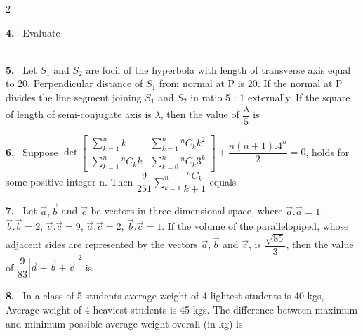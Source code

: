 \documentclass[10pt]{extarticle}
\newcommand{\qn}[1]{\par\smallskip\noindent\textbf{#1.}~}
\begin{document}
\begin{multicols}{2}
\qn{4} Evaluate\\
\\

\qn{5} Let $S_1$ and $S_2$ are focii of the hyperbola with length of transverse axis equal to 20. Perpendicular distance of $S_1$ from normal at P is 20. If the normal at P divides the line segment joining $S_1$ and $S_2$ in ratio 5 : 1 externally. If the square of length of semi-conjugate axis is $\lambda$, then the value of $\dfrac\lambda5$ is

\qn{6} Suppose $\det\begin{bmatrix}\displaystyle\sum_{k=1}^{n}k&\displaystyle\sum_{k=1}^{n}{}^nC_kk^2\\ \displaystyle\sum_{k=1}^{n}{}^nC_kk&\displaystyle\sum_{k=0}^{n}{}^nC_k3^k\end{bmatrix}+\dfrac{n(n+1).4^n}2=0$, holds for some positive integer n. Then $\dfrac9{251}\displaystyle\sum_{k=1}^{n}\dfrac{{}^nC_k}{k+1}$ equals

\qn{7} Let $\vec a,\vec b$ and $\vec c$ be vectors in three-dimensional space, where $\vec a.\vec a=1$, $\vec b.\vec b=2$, $\vec c.\vec c=9$, $\vec a.\vec c=2$, $\vec b.\vec c=1$. If the volume of the parallelopiped, whose adjacent sides are represented by the vectors $\vec a,\vec b$ and $\vec c$, is $\dfrac{\sqrt{85}}3$, then the value of $\dfrac9{83}\left|\vec a+\vec b+\vec c\right|^2$ is

\qn{8} In a class of 5 students average weight of 4 lightest students is 40 kgs, Average weight of 4 heaviest students is 45 kgs. The difference between maximum and minimum possible average weight overall (in kg) is

\end{multicols}
\end{document}
